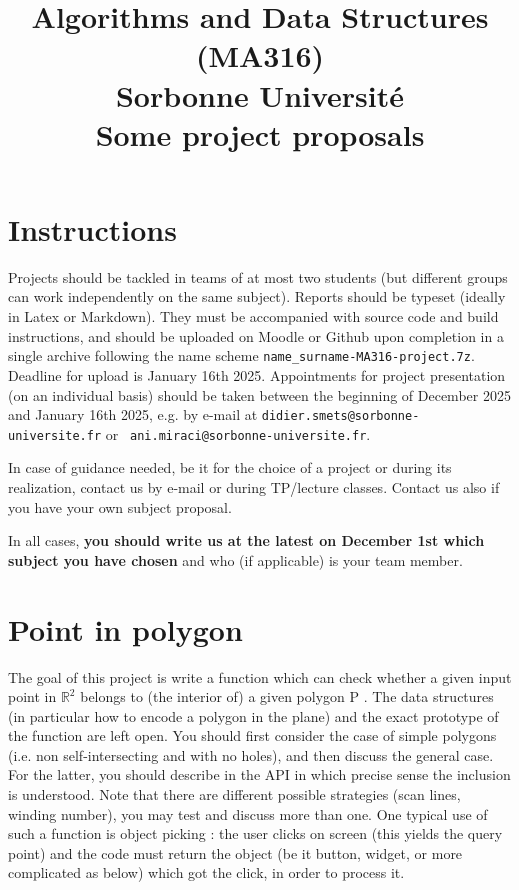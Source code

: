 \documentclass[11pt]{article}
\title{\bf 
	Algorithms and Data Structures (MA316)\\
	Sorbonne Université\\[1cm]
Some project proposals}
\newcommand{\R}{\mathbb{R}}
\begin{document}
\maketitle

\section*{Instructions}

Projects should be tackled in teams of at most two students (but different groups
can work independently on the same subject). Reports should be typeset
(ideally in Latex or Markdown). They must be accompanied with source
code and build instructions, and should be uploaded on Moodle or Github upon
completion in a single archive following the name scheme
\texttt{name\_surname-MA316-project.7z}. Deadline for upload is
January 16th 2025. Appointments for project presentation (on an individual
basis) should be taken between the beginning of December 2025 and January 16th
2025, e.g. by e-mail at {\tt didier.smets@sorbonne-universite.fr} or {\tt
ani.miraci@sorbonne-universite.fr}.

\medskip
In case of guidance needed, be it for the choice of a project or during
its realization, contact us by e-mail or during TP/lecture classes. Contact us
also if you have your own subject proposal.

\medskip
In all cases, {\bf you should write us at the latest on December 1st which subject you have
chosen} and who (if applicable) is your team member.

\bigskip

\section{Point in polygon}

The goal of this project is write a function which can check whether a given
input point in $\R^2$
belongs to (the interior of) a given polygon P . The data structures (in particular how to encode
a polygon in the plane) and the exact prototype of the function are left open. You should first
consider the case of simple polygons (i.e. non self-intersecting and with no holes), and then
discuss the general case. For the latter, you should describe in the API in which precise sense
the inclusion is understood. Note that there are different possible strategies (scan lines, winding
number), you may test and discuss more than one. One typical use of such a function is object
picking : the user clicks on screen (this yields the query point) and the code must return the
object (be it button, widget, or more complicated as below) which got the click, in order to
process it.
\end{document}
